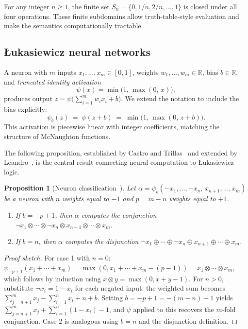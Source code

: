 \documentclass[lettersize,journal]{IEEEtran}
\newtheorem{proposition}[theorem]{Proposition}
\newcommand{\tnorm}{\otimes}      %
\newcommand{\disj}{\oplus}        %
\begin{document}
For any integer $n \geq 1$, the finite set
$S_n = \{0, 1/n, 2/n, \ldots, 1\}$ is closed under all four operations.
These finite subdomains allow truth-table-style evaluation and make the
semantics computationally tractable.

\subsection{\L{}ukasiewicz neural networks}
\label{ssec:lnn}

A neuron with $m$ inputs $x_1, \ldots, x_m \in [0,1]$, weights
$w_1, \ldots, w_m \in \mathbb{R}$, bias $b \in \mathbb{R}$, and
\emph{truncated identity activation}
\begin{equation}
  \psi(x) = \min\!\bigl(1,\, \max(0,\, x)\bigr),
  \label{eq:psi}
\end{equation}
produces output $z = \psi\!\bigl(\sum_{i=1}^m w_i x_i + b\bigr)$.
We extend the notation to include the bias explicitly:
\begin{equation}
  \psi_b(z) \;=\; \psi(z + b) \;=\; \min\!\bigl(1,\,\max(0,\, z + b)\bigr).
  \label{eq:psib}
\end{equation}
This activation is piecewise linear with integer coefficients, matching the
structure of McNaughton functions.

The following proposition, established by Castro and
Trillas~\cite{castro1998} and extended by Leandro~\cite{leandro2009},
is the central result connecting neural computation to \L{}ukasiewicz logic.

\begin{proposition}[Neuron classification~\cite{castro1998,leandro2009}]
\label{prop:classif}
Let $\alpha = \psi_b(-x_1, \ldots, -x_n,\, x_{n+1}, \ldots, x_m)$
be a neuron with $n$ weights equal to $-1$ and $p = m - n$ weights equal to
$+1$.
\begin{enumerate}
  \item If $b = -p + 1$, then $\alpha$ computes the \emph{conjunction}
    $\neg x_1 \tnorm \cdots \tnorm \neg x_n \tnorm x_{n+1}
     \tnorm \cdots \tnorm x_m$.
  \item If $b = n$, then $\alpha$ computes the \emph{disjunction}
    $\neg x_1 \disj \cdots \disj \neg x_n \disj x_{n+1}
     \disj \cdots \disj x_m$.
\end{enumerate}
\end{proposition}

\begin{proof}[Proof sketch]
For case 1 with $n=0$: $\psi_{-p+1}(x_1+\cdots+x_m)
= \max(0, x_1+\cdots+x_m-(p-1)) = x_1 \tnorm \cdots \tnorm x_m$,
which follows by induction using $x \tnorm y = \max(0,x+y-1)$.
For $n > 0$, substitute $\neg x_i = 1-x_i$ for each negated input:
the weighted sum becomes
$\sum_{j=n+1}^m x_j - \sum_{i=1}^n x_i + n + b$.
Setting $b = -p + 1 = -(m-n) + 1$ yields
$\sum_{j=n+1}^m x_j + \sum_{i=1}^n(1-x_i) - 1$,
and $\psi$ applied to this recovers the $m$-fold conjunction.
Case 2 is analogous using $b = n$ and the disjunction definition.
\end{proof}
\end{document}
